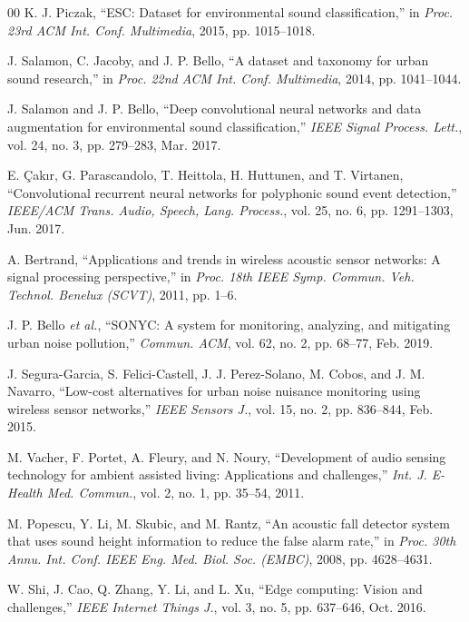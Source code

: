 \documentclass[conference]{IEEEtran}
\begin{document}
\begin{thebibliography}{00}
K. J. Piczak, ``ESC: Dataset for environmental sound classification,'' in \textit{Proc. 23rd ACM Int. Conf. Multimedia}, 2015, pp. 1015--1018.

J. Salamon, C. Jacoby, and J. P. Bello, ``A dataset and taxonomy for urban sound research,'' in \textit{Proc. 22nd ACM Int. Conf. Multimedia}, 2014, pp. 1041--1044.

J. Salamon and J. P. Bello, ``Deep convolutional neural networks and data augmentation for environmental sound classification,'' \textit{IEEE Signal Process. Lett.}, vol. 24, no. 3, pp. 279--283, Mar. 2017.

E. \c{C}ak{\i}r, G. Parascandolo, T. Heittola, H. Huttunen, and T. Virtanen, ``Convolutional recurrent neural networks for polyphonic sound event detection,'' \textit{IEEE/ACM Trans. Audio, Speech, Lang. Process.}, vol. 25, no. 6, pp. 1291--1303, Jun. 2017.

A. Bertrand, ``Applications and trends in wireless acoustic sensor networks: A signal processing perspective,'' in \textit{Proc. 18th IEEE Symp. Commun. Veh. Technol. Benelux (SCVT)}, 2011, pp. 1--6.

J. P. Bello \textit{et al.}, ``SONYC: A system for monitoring, analyzing, and mitigating urban noise pollution,'' \textit{Commun. ACM}, vol. 62, no. 2, pp. 68--77, Feb. 2019.

J. Segura-Garcia, S. Felici-Castell, J. J. Perez-Solano, M. Cobos, and J. M. Navarro, ``Low-cost alternatives for urban noise nuisance monitoring using wireless sensor networks,'' \textit{IEEE Sensors J.}, vol. 15, no. 2, pp. 836--844, Feb. 2015.

M. Vacher, F. Portet, A. Fleury, and N. Noury, ``Development of audio sensing technology for ambient assisted living: Applications and challenges,'' \textit{Int. J. E-Health Med. Commun.}, vol. 2, no. 1, pp. 35--54, 2011.

M. Popescu, Y. Li, M. Skubic, and M. Rantz, ``An acoustic fall detector system that uses sound height information to reduce the false alarm rate,'' in \textit{Proc. 30th Annu. Int. Conf. IEEE Eng. Med. Biol. Soc. (EMBC)}, 2008, pp. 4628--4631.

W. Shi, J. Cao, Q. Zhang, Y. Li, and L. Xu, ``Edge computing: Vision and challenges,'' \textit{IEEE Internet Things J.}, vol. 3, no. 5, pp. 637--646, Oct. 2016.


\end{thebibliography}
\end{document}

